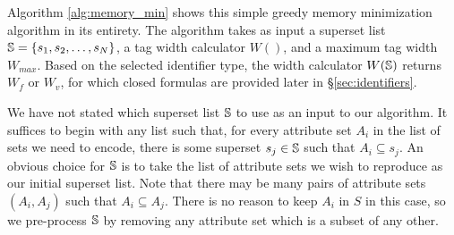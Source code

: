 Algorithm \ref{alg:memory_min} shows this simple greedy memory minimization
algorithm in its entirety. The algorithm takes as input a superset list $\mathbb{S} =
\{s_1, s_2, \dots, s_N\}$, a tag width calculator $W()$, and a maximum tag width $W_{max}$. Based on the selected identifier type, the width calculator $W(\mathbb{S})$ returns $W_f$ or $W_v$, for which closed formulas are provided later in \S \ref{sec:identifiers}.

We have not stated which superset list $\mathbb{S}$ to use as an input to our
algorithm. It suffices to begin with any list such that, for every attribute set
$A_i$ in the list of sets we need to encode, there is some superset $s_j \in
\mathbb{S}$ such that $A_i \subseteq s_j$. An obvious choice for $\mathbb{S}$ is to take the
list of attribute sets we wish to reproduce as our initial superset list. Note
that there may be many pairs of attribute sets $(A_i, A_j)$ such that $A_i
\subseteq A_j$. There is no reason to keep $A_i$ in $S$ in this case, so we
pre-process $\mathbb{S}$ by removing any attribute set which is a subset of any other. 
